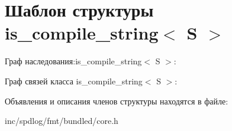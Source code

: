 \hypertarget{structis__compile__string}{}\section{Шаблон структуры is\+\_\+compile\+\_\+string$<$ S $>$}
\label{structis__compile__string}


Граф наследования\+:is\+\_\+compile\+\_\+string$<$ S $>$\+:


Граф связей класса is\+\_\+compile\+\_\+string$<$ S $>$\+:


Объявления и описания членов структуры находятся в файле\+:\begin{DoxyCompactItemize}
\item 
inc/spdlog/fmt/bundled/core.\+h\end{DoxyCompactItemize}

